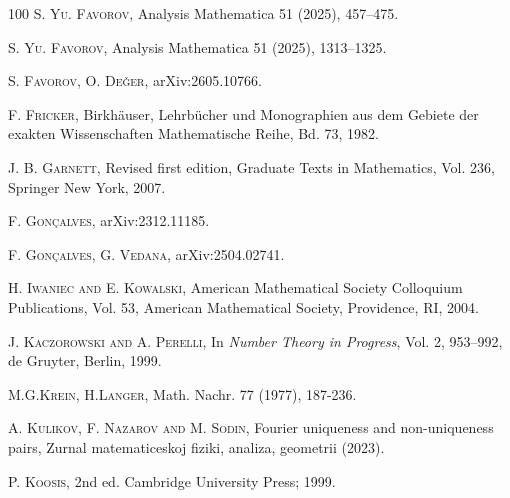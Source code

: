\documentclass[a4paper,reqno,12pt]{amsart}
\newcommand{\1}{{\bf 1}}
\begin{document}
\begin{thebibliography}{100}
\textsc{S. Yu. Favorov},
\newblock Analysis Mathematica 51 (2025), 457--475.

\textsc{S. Yu. Favorov},
\newblock Analysis Mathematica 51 (2025), 1313--1325.

\textsc{S. Favorov, O. De\v{g}er},
\newblock arXiv:2605.10766.


\textsc{F. Fricker},
\newblock Birkhäuser, Lehrbücher und Monographien aus dem Gebiete der exakten Wissenschaften Mathematische Reihe, Bd. 73, 1982.

\textsc{J. B. Garnett},
\newblock Revised first edition, Graduate Texts in Mathematics, Vol. 236, Springer New York, 2007.
  
\textsc{F. Gonçalves},
\newblock arXiv:2312.11185.

\textsc{F. Gonçalves, G. Vedana},
\newblock arXiv:2504.02741.

\textsc{H. Iwaniec and E. Kowalski},
\newblock American Mathematical Society Colloquium Publications, Vol. 53,
American Mathematical Society, Providence, RI, 2004.

\textsc{J. Kaczorowski and A. Perelli},
\newblock In \emph{Number Theory in Progress}, Vol. 2, 953--992,
de Gruyter, Berlin, 1999.

\textsc{M.G.Krein, H.Langer},
\newblock Math. Nachr. 77 (1977), 187-236.

\textsc{A. Kulikov, F. Nazarov and M. Sodin},
Fourier uniqueness and non-uniqueness pairs, Zurnal matematiceskoj fiziki, analiza, geometrii (2023).

\textsc{P. Koosis},
\newblock 2nd ed. Cambridge University Press; 1999.



\end{thebibliography}
\end{document}
